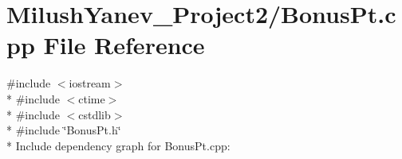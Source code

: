 \section{Milush\+Yanev\+\_\+\+Project2/\+Bonus\+Pt.cpp File Reference}
\label{_bonus_pt_8cpp}
{\ttfamily \#include $<$iostream$>$}\\*
{\ttfamily \#include $<$ctime$>$}\\*
{\ttfamily \#include $<$cstdlib$>$}\\*
{\ttfamily \#include \char`\"{}Bonus\+Pt.\+h\char`\"{}}\\*
Include dependency graph for Bonus\+Pt.\+cpp\+:
